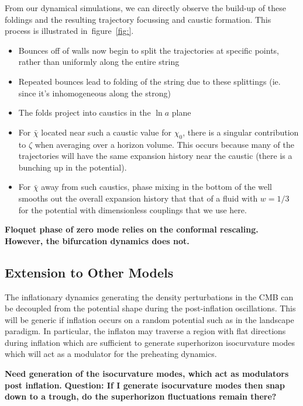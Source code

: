 \documentclass[11pt,a4paper]{article}
\newcommand{\figref}[1]{figure~\ref{#1}}
\begin{document}
From our dynamical simulations, we can directly observe the build-up of these foldings and the resulting trajectory focussing and caustic formation.
This process is illustrated in~\figref{fig:}.

\begin{itemize}
\item Bounces off of walls now begin to split the trajectories at specific points, rather than uniformly along the entire string
\item Repeated bounces lead to folding of the string due to these splittings (ie. since it's inhomogeneous along the strong)
\item The folds project into caustics in the $\ln a$ plane
\item For $\bar{\chi}$ located near such a caustic value for $\chi_0$, there is a singular contribution to $\zeta$ when averaging over a horizon volume.  This occurs because many of the trajectories will have the same expansion history near the caustic (there is a bunching up in the potential).
\item For $\bar{\chi}$ away from such caustics, phase mixing in the bottom of the well smooths out the overall expansion history that that of a fluid with $w=1/3$ for the potential with dimensionless couplings that we use here.
\end{itemize}
{\bf Floquet phase of zero mode relies on the conformal rescaling.  However, the bifurcation dynamics does not.}


\subsection{Extension to Other Models}
The inflationary dynamics generating the density perturbations in the CMB can be decoupled from the potential shape during the post-inflation oscillations.
This will be generic if inflation occurs on a random potential such as in the landscape paradigm.
In particular, the inflaton may traverse a region with flat directions during inflation which are sufficient to generate superhorizon isocurvature modes which will act as a modulator for the preheating dynamics.

{\bf Need generation of the isocurvature modes, which act as modulators post inflation.}
{\bf Question: If I generate isocurvature modes then snap down to a trough, do the superhorizon fluctuations remain there?}
\end{document}
